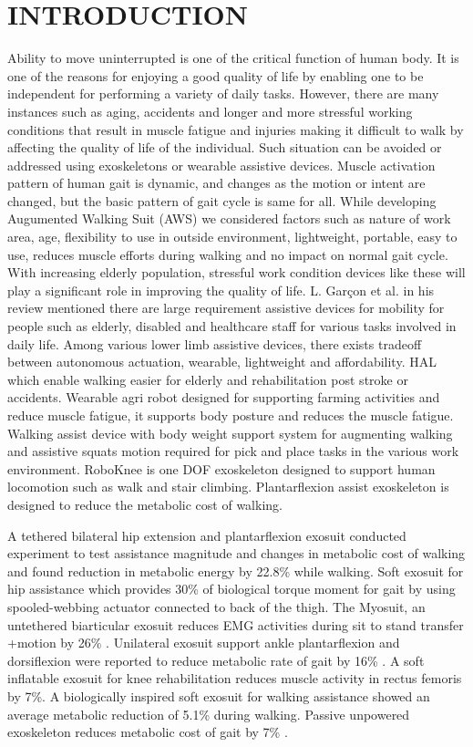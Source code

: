 \documentclass[letterpaper, 10 pt, conference]{ieeeconf}  %
\begin{document}
\section{INTRODUCTION}\label{intro}
Ability to move uninterrupted is one of the critical function of human body. It is one of the reasons for enjoying a good quality of life by enabling one to be independent for performing a variety of daily tasks. However, there are many instances such as aging, accidents and longer and more stressful working conditions that result in muscle fatigue and injuries making it difficult to walk by affecting the quality of life of the individual. Such situation can be avoided or addressed using exoskeletons or wearable assistive devices. Muscle activation pattern of human gait is dynamic, and changes as the motion or intent are changed, but the basic pattern of gait cycle is same for all. While developing Augumented Walking Suit (AWS) we considered factors such as nature of work area, age, flexibility to use in outside environment, lightweight, portable, easy to use, reduces muscle efforts during walking and no impact on normal gait cycle. With increasing elderly population, stressful work condition devices like these will play a significant role in improving the quality of life. L. Garçon et al. \cite{1} in his review mentioned there are large requirement assistive devices for mobility for people such as elderly, disabled and healthcare staff for various tasks involved in daily life. Among various lower limb assistive devices, there exists tradeoff between autonomous actuation, wearable, lightweight and affordability. HAL \cite{2} which enable walking easier for elderly and rehabilitation post stroke or accidents. Wearable agri robot \cite{3} designed for supporting farming activities and reduce muscle fatigue, it supports body posture and reduces the muscle fatigue. Walking assist device with body weight support system \cite{4} for augmenting walking and assistive squats motion required for pick and place tasks in the various work environment. RoboKnee \cite{5} is one DOF exoskeleton designed to support human locomotion such as walk and stair climbing. Plantarflexion assist exoskeleton \cite{6} is designed to reduce the metabolic cost of walking.

A tethered bilateral hip extension and plantarflexion exosuit \cite{7} conducted experiment to test assistance magnitude and changes in metabolic cost of walking and found reduction in metabolic energy by 22.8\% while walking. Soft exosuit for hip assistance which provides 30\% of biological torque moment for gait \cite{8} by using spooled-webbing actuator connected to back of the thigh. The Myosuit, an untethered biarticular exosuit reduces EMG activities during sit to stand transfer +motion by 26\% \cite{9}. Unilateral exosuit support ankle plantarflexion and dorsiflexion were reported to reduce metabolic rate of gait by 16\% \cite{10}. A soft inflatable exosuit for knee rehabilitation \cite{11} reduces muscle activity in rectus femoris by 7\%. A biologically inspired soft exosuit for walking assistance \cite{12} showed an average metabolic reduction of 5.1\% during walking. Passive unpowered exoskeleton reduces metabolic cost of gait by 7\% \cite{13}.
\end{document}
